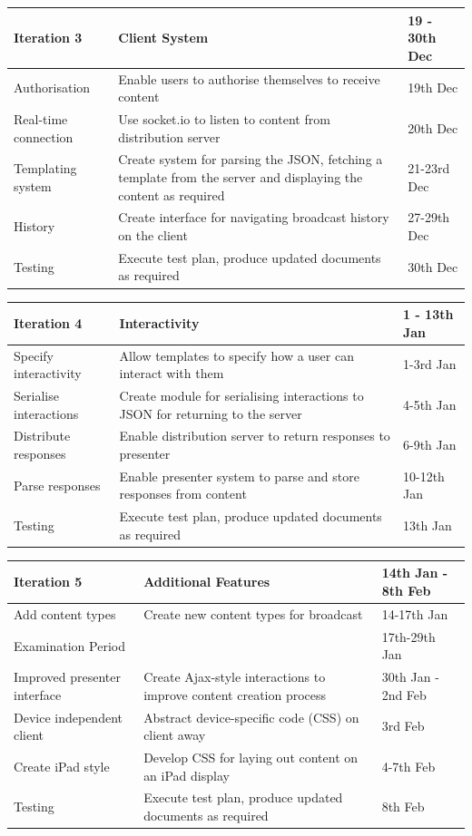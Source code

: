 \documentclass[a4papert,11pt,notitlepage]{article}
\begin{document}
\begin{appendices}
\begin{tabular}{p{5cm} p{7cm} p{4cm}}
\hline
Iteration 3 & Client System & 19 - 30th Dec \\
\hline
Authorisation & Enable users to authorise themselves to receive content & 19th Dec \\
Real-time connection & Use socket.io to listen to content from distribution server & 20th Dec \\
Templating system & Create system for parsing the JSON, fetching a template from the server and displaying the content as required & 21-23rd Dec \\
History & Create interface for navigating broadcast history on the client & 27-29th Dec \\
Testing & Execute test plan, produce updated documents as required & 30th Dec \\
\end{tabular}

\begin{tabular}{p{5cm} p{7cm} p{4cm}}
\hline
Iteration 4 & Interactivity & 1 - 13th Jan \\
\hline
Specify interactivity & Allow templates to specify how a user can interact with them & 1-3rd Jan \\
Serialise interactions & Create module for serialising interactions to JSON for returning to the server & 4-5th Jan \\
Distribute responses & Enable distribution server to return responses to presenter & 6-9th Jan \\
Parse responses & Enable presenter system to parse and store responses from content & 10-12th Jan \\
Testing & Execute test plan, produce updated documents as required & 13th Jan \\
\end{tabular}

\begin{tabular}{p{5cm} p{7cm} p{4cm}}
\hline
Iteration 5 & Additional Features & 14th Jan - 8th Feb \\
\hline
Add content types & Create new content types for broadcast & 14-17th Jan \\
Examination Period & & 17th-29th Jan \\
Improved presenter interface & Create Ajax-style interactions to improve content creation process & 30th Jan - 2nd Feb \\
Device independent client & Abstract device-specific code (CSS) on client away & 3rd Feb \\
Create iPad style & Develop CSS for laying out content on an iPad display & 4-7th Feb \\
Testing & Execute test plan, produce updated documents as required & 8th Feb \\
\end{tabular}


\end{appendices}
\end{document}
